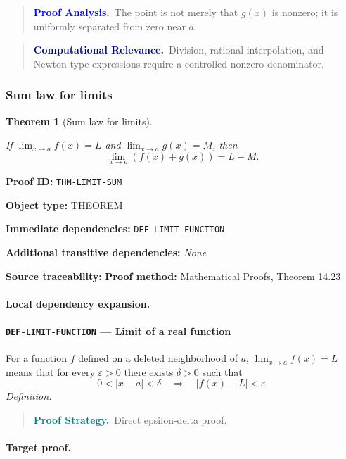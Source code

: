 \documentclass[10pt]{article}
\newcommand{\pidraw}[1]{\begingroup\urlstyle{tt}\nolinkurl{#1}\endgroup}
\newtheorem{theorem}{Theorem}[section]
\theoremstyle{definition}
\theoremstyle{remark}
\newenvironment{proofstrategy}
{\begin{quote}\small\noindent\textbf{\textcolor{teal}{Proof Strategy.}}\ }
{\end{quote}}
\newenvironment{proofanalysis}
{\begin{quote}\small\noindent\textbf{\textcolor{blue}{Proof Analysis.}}\ }
{\end{quote}}
\newenvironment{computationalrelevance}
{\begin{quote}\small\noindent\textbf{\textcolor{navy}{Computational Relevance.}}\ }
{\end{quote}}
\newcommand{\meta}[2]{\noindent\textbf{#1:} #2\par}
\begin{document}
\begin{proofanalysis}The point is not merely that $g(x)$ is nonzero; it is uniformly separated from zero near $a$.\end{proofanalysis}

\begin{computationalrelevance}Division, rational interpolation, and Newton-type expressions require a controlled nonzero denominator.\end{computationalrelevance}

\subsubsection{Sum law for limits}

\begin{theorem}[Sum law for limits]\label{prf:THM-LIMIT-SUM}

If $\lim_{x\to a}f(x)=L$ and $\lim_{x\to a}g(x)=M$, then
\[
\lim_{x\to a}(f(x)+g(x))=L+M.
\]

\end{theorem}

\meta{Proof ID}{\pidraw{THM-LIMIT-SUM}}
\meta{Object type}{THEOREM}
\meta{Immediate dependencies}{\pidraw{DEF-LIMIT-FUNCTION}}
\meta{Additional transitive dependencies}{\emph{None}}
\meta{Source traceability}{\textbf{Proof method:} Mathematical Proofs, Theorem 14.23}

\paragraph{Local dependency expansion.}

\paragraph{\pidraw{DEF-LIMIT-FUNCTION} --- Limit of a real function}
For a function $f$ defined on a deleted neighborhood of $a$, $\lim_{x\to a}f(x)=L$ means that for every $\varepsilon>0$ there exists $\delta>0$ such that
\[
0<|x-a|<\delta\quad\Longrightarrow\quad |f(x)-L|<\varepsilon.
\]
\textit{Definition.}

\begin{proofstrategy}Direct epsilon-delta proof.\end{proofstrategy}

\paragraph{Target proof.}
\end{document}
